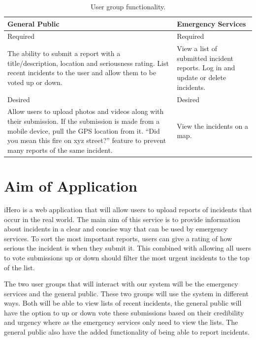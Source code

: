 \documentclass{sig-alt-release2}
\begin{document}
\begin{table}[!ht]
  \caption{User group functionality.}
  \label{user-table}
  \begin{center}
    \begin{tabular}{ | p{3cm} | p{3cm} | }
      \hline
      General Public & Emergency Services \\
      \hline
      Required & Required \\
      \hline
      The ability to submit a report with a title/description, location and seriousness rating. List recent incidents to the user and allow them to be voted up or down. 
      &
      View a list of submitted incident reports. Log in and update or delete incidents. \\
      \hline
      Desired & Desired \\
      \hline
      Allow users to upload photos and videos along with their submission. If the submission is made from a mobile device, pull the GPS location from it. ``Did you mean this fire on xyz street?'' feature to prevent many reports of the same incident.
      &
      View the incidents on a map. \\
      \hline
    \end{tabular}
  \end{center}
\end{table}


\section{Aim of Application}
iHero is a web application that will allow users to upload reports of incidents that occur in the real world. The main aim of this service is to provide information about incidents in a clear and concise way that can be used by emergency services. To sort the most important reports, users can give a rating of how serious the incident is when they submit it. This combined with allowing all users to vote submissions up or down should filter the most urgent incidents to the top of the list.

The two user groups that will interact with our system will be the emergency services and the general public. These two groups will use the system in different ways. Both will be able to view lists of recent incidents, the general public will have the option to up or down vote these submissions based on their credibility and urgency where as the emergency services only need to view the lists. The general public also have the added functionality of being able to report incidents.
\end{document}
